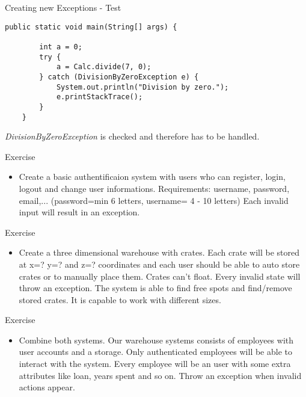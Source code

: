 \begin{frame}[fragile]{Creating new Exceptions - Test}
	\begin{lstlisting}[basicstyle=\ttfamily\scriptsize]
	public static void main(String[] args) {
	
		int a = 0;
		try {
			a = Calc.divide(7, 0);
		} catch (DivisionByZeroException e) {
			System.out.println("Division by zero.");
			e.printStackTrace();
		}
	}
	\end{lstlisting}	
	\emph{DivisionByZeroException} is checked and therefore has to be handled.
\end{frame}

\begin{frame}{Exercise}
	\begin{itemize}
		\item Create a basic authentificaion system with users who can register, login, logout and change user informations.
		Requirements: username, password, email,... (password=min 6 letters, username= 4  - 10 letters)
		Each invalid input will result in an exception.
	\end{itemize}
\end{frame}

\begin{frame}{Exercise}
	\begin{itemize}
		\item Create a three dimensional warehouse with crates. Each crate will be stored at x=? y=? and z=? coordinates and 
		each user should be able to auto store crates or to manually place them. Crates can't float. Every invalid state will throw an exception.
		The system is able to find free spots and find/remove stored crates. It is capable to work with different sizes.
\end{itemize}
\end{frame}

\begin{frame}{Exercise}
	\begin{itemize}
		\item Combine both systems. Our warehouse systems consists of employees with user accounts and a storage.
		Only authenticated employees will be able to interact with the system.
		Every employee will be an user with some extra attributes like loan, years spent and so on.
		Throw an exception when invalid actions appear.
	\end{itemize}
\end{frame}


